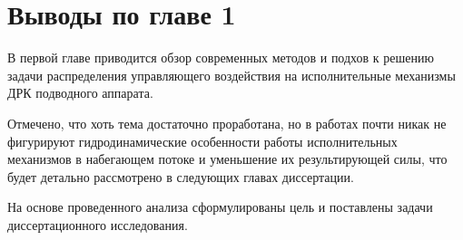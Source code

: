 \section{Выводы по главе 1}\label{sec:Statement/Conclusion}
В первой главе приводится обзор современных методов и подхов к решению задачи распределения управляющего воздействия на исполнительные механизмы ДРК подводного аппарата.

Отмечено, что хоть тема достаточно проработана, но в работах почти никак не фигурируют гидродинамические особенности работы исполнительных механизмов в набегающем потоке и уменьшение их результирующей силы, что будет детально рассмотрено в следующих главах диссертации.

На основе проведенного анализа сформулированы цель и поставлены задачи диссертационного исследования.
